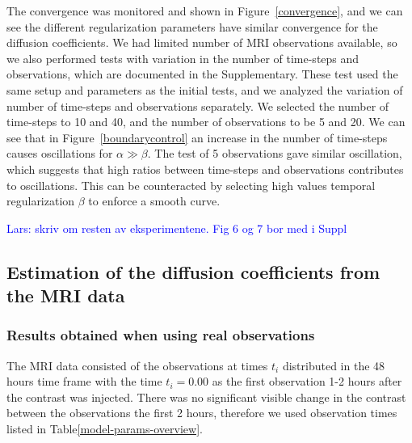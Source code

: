 \documentclass[12pt,a4paper]{article}
\newcommand{\kam}[1]{\textcolor{blue}{#1}}
\begin{document}
The convergence was monitored and shown in Figure~\ref{convergence}, and we can see the different regularization parameters have similar convergence for the diffusion coefficients. 
We had limited number of MRI observations available, so we also performed tests with variation in the number of time-steps and observations, which are documented in the Supplementary. These test used the same setup and parameters as the initial tests, and we analyzed the variation of number of time-steps and observations separately.
We selected the number of time-steps to 10 and 40, and the number of observations to be 5 and 20. We can see that in  Figure~\ref{boundarycontrol} an increase in the number of time-steps causes oscillations for $\alpha\gg\beta$. The test of 5 observations gave similar oscillation, which suggests that high ratios between time-steps and observations contributes to oscillations. This can be counteracted by selecting high values temporal regularization $\beta$ to enforce a smooth curve.  














\kam{Lars: skriv om resten av eksperimentene. Fig 6 og 7 bor med i Suppl}   

\subsection{Estimation of the diffusion coefficients from the MRI data} 

\subsubsection{Results obtained when using real observations}
The MRI data consisted of the observations at times $t_i$ distributed in the 48 hours time frame with the time $t_i=0.00$ as the first observation 1-2 hours after the contrast was injected. There was no significant visible change in the contrast between the observations the first 2 hours, therefore we used observation times listed in Table\ref{model-params-overview}.
\end{document}
